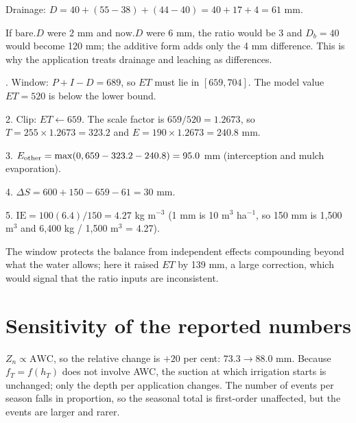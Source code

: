 Drainage: $D=40+(55-38)+(44-40)=40+17+4=61$ mm.

 If $\mathrm{bare}.D$ were $2$ mm and $\mathrm{now}.D$ were $6$ mm, the ratio would be 3 and $D_b=40$ would become 120 mm; the additive form adds only the 4 mm difference. This is why the application treats drainage and leaching as differences.


. Window: $P+I-D=689$, so $ET$ must lie in $[659,704]$. The model value $ET=520$ is below the lower bound.

2. Clip: $ET\leftarrow659$. The scale factor is $659/520=1.2673$, so $T=255\times1.2673=323.2$ and $E=190\times1.2673=240.8$ mm.

3. $E_{\rm other}=\max(0,659-323.2-240.8)=95.0$ mm (interception and mulch evaporation).

4. $\Delta S=600+150-659-61=30$ mm.

5. $\mathrm{IE}=100(6.4)/150=4.27$ kg m$^{-3}$ (1 mm is 10 m$^3$ ha$^{-1}$, so 150 mm is 1,500 m$^3$ and 6,400 kg / 1,500 m$^3$ = 4.27).

 The window protects the balance from independent effects compounding beyond what the water allows; here it raised $ET$ by 139 mm, a large correction, which would signal that the ratio inputs are inconsistent.


\section{Sensitivity of the reported numbers}
\sol  $Z_n\propto \mathrm{AWC}$, so the relative change is $+20$ per cent: $73.3\to88.0$ mm. Because $f_T=f(h_T)$ does not involve AWC, the suction at which irrigation starts is unchanged; only the depth per application changes. The number of events per season falls in proportion, so the seasonal total is first-order unaffected, but the events are larger and rarer.

